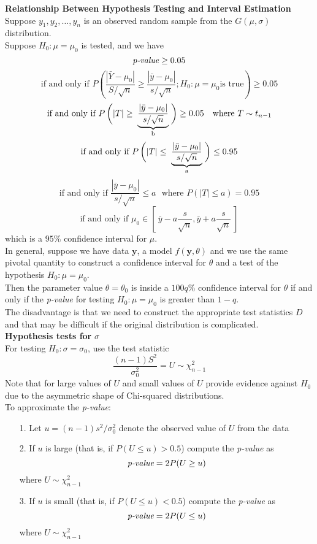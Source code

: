 \documentclass[12pt, leqno]{article}
\theoremstyle{definition}
\begin{document}
  \textbf{Relationship Between Hypothesis Testing and Interval Estimation} \\
  Suppose $y_1, y_2, \dots, y_n$ is an observed random sample from the $G(\mu, \sigma)$ distribution. \\
  Suppose $H_0 : \mu = \mu_0$ is tested, and we have
  $$\emph{p-value} \geq 0.05$$
  $$\text{if and only if } P\left(\frac{|\bar{Y} - \mu_0|}{S/\sqrt{n}} \geq \frac{|\bar{y} - \mu_0|}{s/\sqrt{n}}; H_0 : \mu = \mu_0 \text{is true}\right) \geq 0.05$$
  $$
  \text{if and only if } P\left(|T| \geq \vphantom{\frac{|\bar{y} - \mu_0|}{s/\sqrt{n}}}\right.
  \underbrace{\frac{|\bar{y} - \mu_0|}{s/\sqrt{n}}}_{\text{b}}
  \left.\vphantom{\frac{|\bar{y} - \mu_0|}{s/\sqrt{n}}}\right) \geq 0.05 ~~~\text{where } T \sim t_{n-1}
  $$
  $$
  \text{if and only if } P\left(|T| \leq \vphantom{\frac{|\bar{y} - \mu_0|}{s/\sqrt{n}}}\right.
  \underbrace{\frac{|\bar{y} - \mu_0|}{s/\sqrt{n}}}_{\text{a}}
  \left.\vphantom{\frac{|\bar{y} - \mu_0|}{s/\sqrt{n}}}\right) \leq 0.95
  $$
  $$\text{if and only if } \frac{|\bar{y} - \mu_0|}{s/\sqrt{n}} \leq a ~~~\text{where } P(|T| \leq a) = 0.95$$
  $$\text{if and only if } \mu_0 \in \left[~\bar{y} - a\frac{s}{\sqrt{n}}, \bar{y} + a\frac{s}{\sqrt{n}}~\right]$$
  which is a $95\%$ confidence interval for $\mu$. \\

  In general, suppose we have data $\textbf{y}$, a model $f(\textbf{y},\theta)$ and we use the same pivotal quantity to construct a confidence interval for $\theta$ and a test of the hypothesis $H_0 : \mu = \mu_0$. \\
  Then the parameter value $\theta = \theta_0$ is inside a $100q\%$ confidence interval for $\theta$ if and only if the \emph{p-value} for testing $H_0 : \mu = \mu_0$ is greater than $1 - q$. \\

  The disadvantage is that we need to construct the appropriate test statistics $D$ and that may be difficult if the original distribution is complicated. \\

  \textbf{Hypothesis tests for} $\sigma$ \\
  For testing $H_0 : \sigma = \sigma_0$, use the test statistic
  $$\frac{(n-1)S^{2}}{\sigma_{0}^{2}} = U \sim \chi_{n-1}^{2}$$
  Note that for large values of $U$ and small values of $U$ provide evidence against $H_0$ due to the asymmetric shape of Chi-squared distributions. \\
  To approximate the \emph{p-value}:
  \begin{itemize}
    \item[1.] Let $u = (n-1)s^{2}/\sigma_{0}^{2}$ denote the observed value of $U$ from the data
    \item[2.] If $u$ is large (that is, if $P(U \leq u) > 0.5$) compute the \emph{p-value} as
    $$\emph{p-value} = 2P(U \geq u)$$
    where $U \sim \chi^{2}_{n-1}$
    \item[3.] If $u$ is small (that is, if $P(U \leq u) < 0.5$) compute the \emph{p-value} as
    $$\emph{p-value} = 2P(U \leq u)$$
    where $U \sim \chi^{2}_{n-1}$
  \end{itemize}
\end{document}
